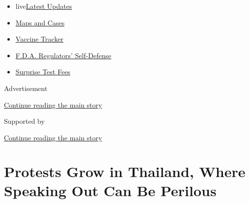 \begin{itemize}
\tightlist
\item
  live\href{https://www.nytimes3xbfgragh.onion/2020/09/12/world/covid-19-coronavirus.html?name=styln-coronavirus-national\&region=TOP_BANNER\&block=storyline_menu_recirc\&action=click\&pgtype=Article\&impression_id=807a17c0-f52d-11ea-af4d-233cac0e4b1b\&variant=undefined}{Latest
  Updates}
\item
  \href{https://www.nytimes3xbfgragh.onion/interactive/2020/us/coronavirus-us-cases.html?name=styln-coronavirus-national\&region=TOP_BANNER\&block=storyline_menu_recirc\&action=click\&pgtype=Article\&impression_id=807a17c1-f52d-11ea-af4d-233cac0e4b1b\&variant=undefined}{Maps
  and Cases}
\item
  \href{https://www.nytimes3xbfgragh.onion/interactive/2020/science/coronavirus-vaccine-tracker.html?name=styln-coronavirus-national\&region=TOP_BANNER\&block=storyline_menu_recirc\&action=click\&pgtype=Article\&impression_id=807a17c2-f52d-11ea-af4d-233cac0e4b1b\&variant=undefined}{Vaccine
  Tracker}
\item
  \href{https://www.nytimes3xbfgragh.onion/2020/09/10/us/politics/fda-coronavirus-vaccine.html?name=styln-coronavirus-national\&region=TOP_BANNER\&block=storyline_menu_recirc\&action=click\&pgtype=Article\&impression_id=807a17c3-f52d-11ea-af4d-233cac0e4b1b\&variant=undefined}{F.D.A.
  Regulators' Self-Defense}
\item
  \href{https://www.nytimes3xbfgragh.onion/2020/09/09/upshot/coronavirus-surprise-test-fees.html?name=styln-coronavirus-national\&region=TOP_BANNER\&block=storyline_menu_recirc\&action=click\&pgtype=Article\&impression_id=807a17c4-f52d-11ea-af4d-233cac0e4b1b\&variant=undefined}{Surprise
  Test Fees}
\end{itemize}

Advertisement

\protect\hyperlink{after-top}{Continue reading the main story}

Supported by

\protect\hyperlink{after-sponsor}{Continue reading the main story}

\hypertarget{protests-grow-in-thailand-where-speaking-out-can-be-perilous}{%
\section{Protests Grow in Thailand, Where Speaking Out Can Be
Perilous}\label{protests-grow-in-thailand-where-speaking-out-can-be-perilous}}

